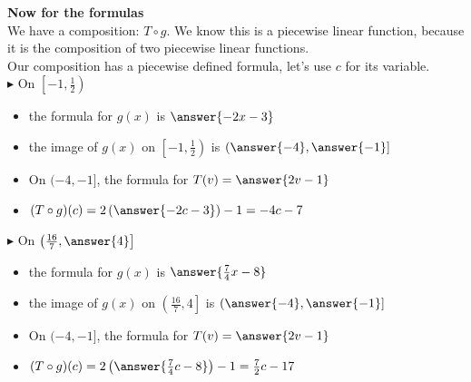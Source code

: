 \documentclass{ximera}
\begin{document}
\begin{explanation}



\textbf{\textcolor{purple!85!blue}{Now for the formulas}} \\


We have a composition: $T \circ g$.  We know this is a piecewise linear function, because it is the composition of two piecewise linear functions. \\

Our composition has a piecewise defined formula, let's use $c$ for its variable. \\





$\blacktriangleright$ On $\left[ -1, \frac{1}{2} \right)$




\begin{itemize}

\item the formula for $g(x)$ is $\answer{-2x-3}$
\item the image of $g(x)$ on $\left[ -1, \frac{1}{2} \right)$ is $\left( \answer{-4}, \answer{-1} \right]$
\item On $( -4, -1 ]$, the formula for $T(v) = \answer{2v-1}$  \\
\item $(T \circ g)(c) = 2 \left(\answer{-2c-3}\right) - 1 = -4c - 7$ \\


\end{itemize}








$\blacktriangleright$ On $\left( \frac{16}{7}, \answer{4} \right]$



\begin{itemize}

\item the formula for $g(x)$ is $\answer{\frac{7}{4}x - 8}$
\item the image of $g(x)$ on $\left( \frac{16}{7}, 4 \right]$ is $\left( \answer{-4}, \answer{-1} \right]$
\item On $( -4, -1 ]$, the formula for $T(v) = \answer{2v-1}$  \\
\item $(T \circ g)(c) = 2\left(\answer{\frac{7}{4}c - 8}\right) - 1 = \frac{7}{2}c - 17$ \\



\end{itemize}
\end{explanation}
\end{document}
